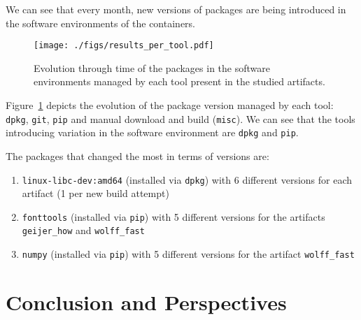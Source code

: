 \documentclass[sigconf,natbib=false]{acmart}
\begin{document}
We can see that every month, new versions of packages are being introduced in the software environments of the containers.



\begin{figure}
  \centering
  \texttt{[image: ./figs/results\_per\_tool.pdf]}
  \caption{
    Evolution through time of the packages in the software environments managed by each tool present in the studied artifacts.
  }\label{fig:results_per_tool}
\end{figure}

Figure~\ref{fig:results_per_tool} depicts the evolution of the package version managed by each tool: \texttt{dpkg}, \texttt{git}, \texttt{pip} and manual download and build (\texttt{misc}).
We can see that the tools introducing variation in the software environment are \texttt{dpkg} and \texttt{pip}.

The packages that changed the most in terms of versions are:
\begin{enumerate}
\item \texttt{linux-libc-dev:amd64} (installed via \texttt{dpkg}) with 6 different versions for each artifact (1 per new build attempt)
\item \texttt{fonttools} (installed via \texttt{pip}) with 5 different versions for the artifacts \texttt{geijer\_how} and \texttt{wolff\_fast}
\item \texttt{numpy} (installed via \texttt{pip}) with 5 different versions for the artifact \texttt{wolff\_fast}
\end{enumerate}


\section{Conclusion and Perspectives}\label{sec:conclusion}
\end{document}
